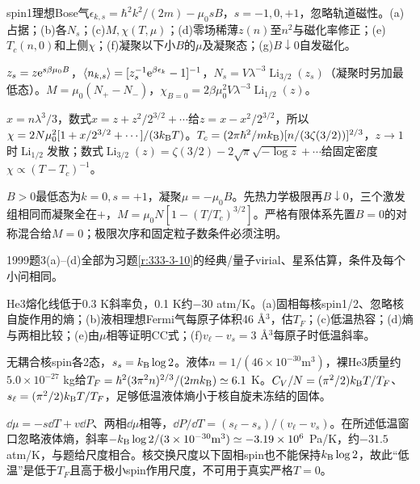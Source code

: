 \begin{exercise}[1999题2(a)--(g)]\label{f:333-1999-2}
spin1理想Bose气$\epsilon_{k,s}=\hbar^2k^2/(2m)-\mu_0sB$，$s=-1,0,+1$，忽略轨道磁性。(a)占据；(b)各$N_s$；(c)$M,\chi(T,\mu)$；(d)零场稀薄$z(n)$至$n^2$与磁化率修正；(e)$T_c(n,0)$和上侧$\chi$；(f)凝聚以下小$B$的$\mu$及凝聚态；(g)$B\downarrow0$自发磁化。
\end{exercise}
\begin{solution}
$z_s=z\mathrm e^{s\beta\mu_0B}$，$\langle n_{k,s}\rangle=[z_s^{-1}\mathrm e^{\beta\epsilon_k}-1]^{-1}$，$N_s=V\lambda^{-3}\operatorname{Li}_{3/2}(z_s)$（凝聚时另加最低态）。$M=\mu_0(N_+-N_-)$，$\chi_{B=0}=2\beta\mu_0^2V\lambda^{-3}\operatorname{Li}_{1/2}(z)$。

$x=n\lambda^3/3$，数式$x=z+z^2/2^{3/2}+\cdots$给$z=x-x^2/2^{3/2}$，所以$\chi=2N\mu_0^2[1+x/2^{3/2}+\cdots]/(3k_{\mathrm B} T)$。$T_c=(2\pi\hbar^2/mk_{\mathrm B})[n/(3\zeta(3/2))]^{2/3}$，$z\to1$时$\operatorname{Li}_{1/2}$发散；数式$\operatorname{Li}_{3/2}(z)=\zeta(3/2)-2\sqrt\pi\sqrt{-\log z}+\cdots$给固定密度$\chi\propto(T-T_c)^{-1}$。

$B>0$最低态为$k=0,s=+1$，凝聚$\mu=-\mu_0B$。先热力学极限再$B\downarrow0$，三个激发组相同而凝聚全在$+$，$M=\mu_0N[1-(T/T_c)^{3/2}]$。严格有限体系先置$B=0$的对称混合给$M=0$；极限次序和固定粒子数条件必须注明。
\end{solution}
1999题3(a)--(d)全部为习题\ref{r:333-3-10}的经典/量子virial、星系估算，条件及每个小问相同。
\begin{exercise}[2000题1(a)--(f)]\label{f:333-2000-1}
He3熔化线低于0.3 K斜率负，0.1 K约$-30$ atm/K。(a)固相每核spin1/2、忽略核自旋作用的熵；(b)液相理想Fermi气每原子体积46 Å$^3$，估$T_F$；(c)低温热容；(d)熵与两相比较；(e)由$\mu$相等证明CC式；(f)$v_\ell-v_s=3$ Å$^3$每原子时低温斜率。
\end{exercise}
\begin{solution}
无耦合核spin各2态，$s_s=k_{\mathrm B}\log2$。液体$n=1/(46\times10^{-30}\mathrm{m^3})$，裸He3质量约$5.0\times10^{-27}$ kg给$T_F=\hbar^2(3\pi^2n)^{2/3}/(2mk_{\mathrm B})\simeq6.1$ K。$C_V/N=(\pi^2/2)k_{\mathrm B} T/T_F$、$s_\ell=(\pi^2/2)k_{\mathrm B} T/T_F$，足够低温液体熵小于核自旋未冻结的固体。

$\dd\mu=-s\dd T+v\dd P$、两相$\dd\mu$相等，$\dd P/\dd T=(s_\ell-s_s)/(v_\ell-v_s)$。在所述低温窗口忽略液体熵，斜率$-k_{\mathrm B}\log2/(3\times10^{-30}\mathrm{m^3})\simeq-3.19\times10^6$ Pa/K，约$-31.5$ atm/K，与题给尺度相合。核交换尺度以下固相spin也不能保持$k_{\mathrm B}\log2$，故此“低温”是低于$T_F$且高于极小spin作用尺度，不可用于真实严格$T=0$。
\end{solution}
